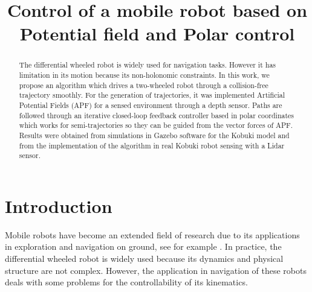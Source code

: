 \documentclass[conference]{IEEEtran}
\begin{document}
\title{Control of a mobile robot based on Potential field and Polar control}
\author{
}
\maketitle
\begin{abstract}
The differential wheeled robot is widely used for navigation tasks. However it has limitation in its motion because its non-holonomic constraints. In this work, we propose an algorithm which drives a two-wheeled robot through a collision-free trajectory smoothly. For the generation of trajectories, it was implemented Artificial Potential Fields (APF) for a sensed environment through a depth sensor. Paths are followed through an iterative closed-loop feedback controller based in polar coordinates which works for semi-trajectories so they can be guided from the vector forces  of APF. Results were obtained from simulations in Gazebo software for the Kobuki model and from the implementation of the algorithm in real Kobuki robot sensing  with a Lidar sensor.
\end{abstract}
\IEEEpeerreviewmaketitle

\section{Introduction}

Mobile robots have become an extended field of research due to its applications in exploration and navigation on ground, see for example \cite{Bonin-Font2008}. In practice, the differential wheeled robot is widely used because its dynamics and physical structure are not complex. However, the application in navigation of these robots deals with some problems for the controllability of its kinematics.
\end{document}

